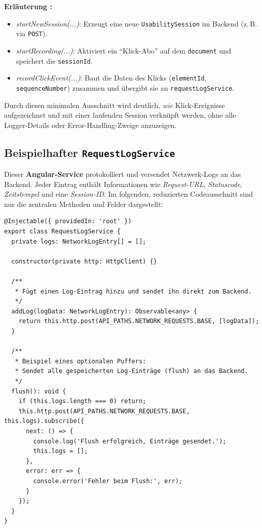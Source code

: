 \documentclass[12pt,oneside]{article}
\begin{document}
\noindent
\textbf{Erläuterung :}
\begin{itemize}
  \item \emph{startNewSession(...)}: Erzeugt eine neue \lstinline|UsabilitySession| im Backend (z.\,B. via \lstinline|POST|).
  \item \emph{startRecording(...)}: Aktiviert ein \enquote{Klick-Abo} auf dem \lstinline|document| und speichert die \lstinline|sessionId|.
  \item \emph{recordClickEvent(...)}: Baut die Daten des Klicks (\lstinline|elementId|, \lstinline|sequenceNumber|) zusammen und übergibt sie an \lstinline|requestLogService|.
\end{itemize}

Durch diesen minimalen Ausschnitt wird deutlich, \emph{wie} Klick-Ereignisse aufgezeichnet und mit einer laufenden Session verknüpft werden, ohne alle Logger-Details oder Error-Handling-Zweige anzuzeigen.

\subsection{Beispielhafter \lstinline|RequestLogService| }
\label{subsec:frontend_requestlog}

Dieser \textbf{Angular-Service} protokolliert und versendet Netzwerk-Logs an das Backend. Jeder Eintrag enthält Informationen wie \emph{Request-URL}, \emph{Statuscode}, \emph{Zeitstempel} und eine \emph{Session-ID}. Im folgenden, reduzierten Codeausschnitt sind nur die zentralen Methoden und Felder dargestellt:
 
\begin{lstlisting}
@Injectable({ providedIn: 'root' })
export class RequestLogService {
  private logs: NetworkLogEntry[] = [];

  constructor(private http: HttpClient) {}

  /**
   * Fügt einen Log-Eintrag hinzu und sendet ihn direkt zum Backend.
   */
  addLog(logData: NetworkLogEntry): Observable<any> {
    return this.http.post(API_PATHS.NETWORK_REQUESTS.BASE, [logData]);
  }

  /**
   * Beispiel eines optionalen Puffers:
   * Sendet alle gespeicherten Log-Einträge (flush) an das Backend.
   */
  flush(): void {
    if (this.logs.length === 0) return;
    this.http.post(API_PATHS.NETWORK_REQUESTS.BASE, this.logs).subscribe({
      next: () => {
        console.log('Flush erfolgreich, Einträge gesendet.');
        this.logs = [];
      },
      error: err => {
        console.error('Fehler beim Flush:', err);
      }
    });
  }
}
\end{lstlisting}
\end{document}
